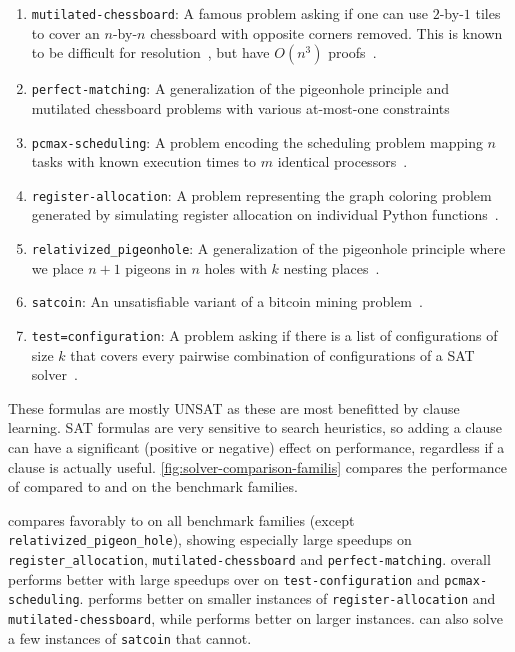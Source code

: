 \begin{enumerate}
    \item \texttt{mutilated-chessboard}: A famous problem asking if one can use $2$-by-$1$ tiles to cover an $n$-by-$n$ chessboard with opposite corners removed. This is known to be difficult for resolution~\cite{chessboard-resolution}, but have $O(n^3)$ \pr proofs~\cite{mutilatedchessboard-pr}.
    \item \texttt{perfect-matching}: A generalization of the pigeonhole principle and mutilated chessboard problems with various at-most-one constraints~\cite{bipartgen}
    \item \texttt{pcmax-scheduling}: A problem encoding the scheduling problem mapping $n$ tasks with known execution times to $m$ identical processors~\cite{pcmax}.
    \item \texttt{register-allocation}: A problem representing the graph coloring problem generated by simulating register allocation on individual Python functions~\cite{register-allocation}.
    \item \texttt{relativized\_pigeonhole}: A generalization of the pigeonhole principle where we place $n+1$ pigeons in $n$ holes with $k$ nesting places~\cite{relativized-pigeonhole}.
    \item \texttt{satcoin}: An unsatisfiable variant of a bitcoin mining problem~\cite{satcoin}.
    \item \texttt{test=configuration}: A problem asking if there is a list of configurations of size $k$ that covers every pairwise combination of configurations of a SAT solver~\cite{test-configuration}.
\end{enumerate}

These formulas are mostly UNSAT as these are most benefitted by \pr clause learning. SAT formulas are very sensitive to search heuristics, so adding a \pr clause can have a significant (positive or negative) effect on performance, regardless if a clause is actually useful. \autoref{fig:solver-comparison-familis} compares the performance of \tool compared to \cadical and \prelearn on the benchmark families. 

\tool compares favorably to \cadical on all benchmark families (except \texttt{relativized\_pigeon\_hole}), showing especially large speedups on \texttt{register\_allocation}, \texttt{mutilated-chessboard} and \texttt{perfect-matching}.
\prelearn overall performs better with large speedups over \tool on \texttt{test-configuration} and \texttt{pcmax-scheduling}. \tool performs better on smaller instances of \texttt{register-allocation} and \texttt{mutilated-chessboard}, while \prelearn performs better on larger instances. \tool can also solve a few instances of \texttt{satcoin} that \prelearn cannot.


